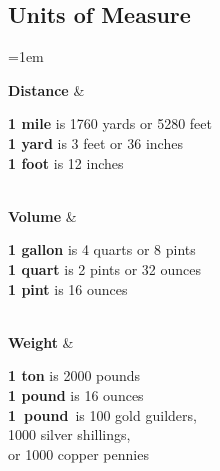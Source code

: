 \documentclass[itdr/core]{subfiles}
\begin{document}
\begin{dbox}
	\subsection*{Units of Measure}

\bgroup
\tabcolsep=1em

\begin{dtable}[cL]
	\textbf{Distance} & \parbox{\linewidth}{%
			\textbf{1 mile} is 1760 yards or 5280 feet\\
			\textbf{1 yard} is 3 feet or 36 inches\\
			\textbf{1 foot} is 12 inches} \\
	\midrule
	\textbf{Volume} & \parbox{\linewidth}{%
			\textbf{1 gallon} is 4 quarts or 8 pints\\
			\textbf{1 quart} is 2 pints or 32 ounces\\
			\textbf{1 pint} is 16 ounces} \\
	\midrule
	\textbf{Weight} & \parbox{\linewidth}{%
			\textbf{1 ton} is 2000 pounds\\
			\textbf{1 pound} is 16 ounces\\
			\mbox{\textbf{1 pound} is} 100 gold guilders,\\1000 silver shillings,\\or 1000 copper pennies } \\
\end{dtable}
\egroup

\begin{comment}
	\subparagraph{Distance}
	\begin{itemize}
		\item \textbf{1 mile} is 1760 yards or 5280 feet
		\item \textbf{1 yard} is 3 feet or 36 inches
		\item \textbf{1 foot} is 12 inches
	\end{itemize}

	\subparagraph{Volume}
	\begin{itemize}
		\item \textbf{1 gallon} is 4 quarts or 8 pints
		\item \textbf{1 quart} is 2 pints or 32 ounces
		\item \textbf{1 pint} is 16 ounces
	\end{itemize}
	
	\subparagraph{Weight}
	\begin{itemize}
		\item \textbf{1 ton} is 2000 pounds
		\item \textbf{1 pound} is 16 ounces
		\item \mbox{\textbf{1 pound} is} 100 gold guilders, 1000 silver shillings, or 1000 copper pennies
	\end{itemize}
\end{comment}
\end{dbox}

\break
\end{document}

